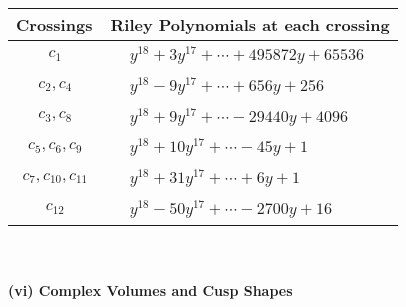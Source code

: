 \documentclass[1p]{elsarticle_modified}
\theoremstyle{definition}
\begin{document}
\begin{tabular}{m{50pt}|m{274pt}}
Crossings & \hspace{64pt}Riley Polynomials at each crossing \\
\hline $$\begin{aligned}c_{1}\end{aligned}$$&$\begin{aligned}
&y^{18}+3 y^{17}+\cdots+495872 y+65536
\end{aligned}$\\
\hline $$\begin{aligned}c_{2},c_{4}\end{aligned}$$&$\begin{aligned}
&y^{18}-9 y^{17}+\cdots+656 y+256
\end{aligned}$\\
\hline $$\begin{aligned}c_{3},c_{8}\end{aligned}$$&$\begin{aligned}
&y^{18}+9 y^{17}+\cdots-29440 y+4096
\end{aligned}$\\
\hline $$\begin{aligned}c_{5},c_{6},c_{9}\end{aligned}$$&$\begin{aligned}
&y^{18}+10 y^{17}+\cdots-45 y+1
\end{aligned}$\\
\hline $$\begin{aligned}c_{7},c_{10},c_{11}\end{aligned}$$&$\begin{aligned}
&y^{18}+31 y^{17}+\cdots+6 y+1
\end{aligned}$\\
\hline $$\begin{aligned}c_{12}\end{aligned}$$&$\begin{aligned}
&y^{18}-50 y^{17}+\cdots-2700 y+16
\end{aligned}$\\
\hline
\end{tabular}\\~\\
\newpage\flushleft \textbf{(vi) Complex Volumes and Cusp Shapes}
\end{document}
